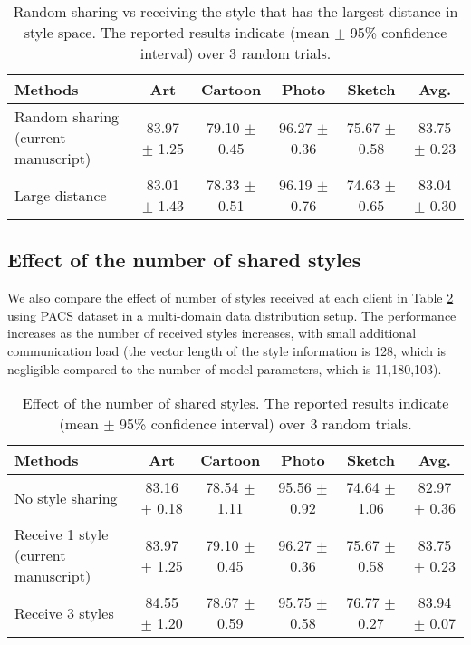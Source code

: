 \documentclass{article}
\theoremstyle{plain}
\theoremstyle{definition}
\theoremstyle{remark}
\begin{document}
\begin{table}[!h]
\scriptsize
\centering
	\begin{tabular}{l|    cccc | c}
		\toprule  
		Methods   &Art  & Cartoon & Photo & Sketch & Avg. \\ 
		\midrule	
		Random sharing (current manuscript)  &83.97 $\pm$ 1.25 & 79.10 $\pm$ 0.45 & 96.27 $\pm$ 0.36 & 75.67 $\pm$ 0.58 & 83.75 $\pm$ 0.23 \\	
		Large distance & 83.01 $\pm$ 1.43 & 78.33 $\pm$ 0.51 & 96.19 $\pm$ 0.76 & 74.63 $\pm$ 0.65 & 83.04 $\pm$ 0.30  \\
		\bottomrule
	\end{tabular}
\vspace{+3mm}
\caption{Random sharing vs receiving the style that has the largest distance in style space. The reported results indicate (mean $\pm$ 95\% confidence interval) over 3 random trials.} 
\label{table:largedistance}
\end{table}  

\subsection{Effect of the number of shared styles}
We also compare the effect of number of styles received at each client in Table \ref{table:numsharestyles} using PACS dataset in a multi-domain data distribution setup. The performance increases as the number of received styles increases, with small additional communication load (the vector length of the style information is 128, which is negligible compared to the number of model parameters, which is 11,180,103).

\begin{table}[!h]
\scriptsize
\centering
	\begin{tabular}{l|    cccc | c}
		\toprule  
		Methods   &Art  & Cartoon & Photo & Sketch & Avg. \\ 
		\midrule	
		No style sharing &83.16 $\pm$ 0.18 & 78.54 $\pm$ 1.11 & 95.56 $\pm$ 0.92 & 74.64 $\pm$ 1.06 & 82.97 $\pm$ 0.36 \\	
		Receive 1 style (current manuscript) &83.97 $\pm$ 1.25 & 79.10 $\pm$ 0.45 & 96.27 $\pm$ 0.36 & 75.67 $\pm$ 0.58 & 83.75 $\pm$ 0.23 \\
		Receive 3 styles & 84.55 $\pm$ 1.20 & 78.67 $\pm$ 0.59 & 95.75 $\pm$ 0.58 & 76.77 $\pm$  0.27 & 83.94 $\pm$  0.07 \\
		\bottomrule
	\end{tabular}
\vspace{+3mm}
\caption{Effect of the number of shared styles. The reported results indicate (mean $\pm$ 95\% confidence interval) over 3 random trials. } 
\label{table:numsharestyles}
\end{table}
\end{document}
